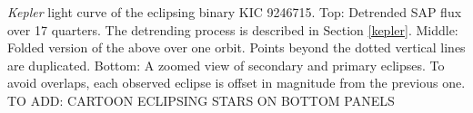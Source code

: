\label{fig:keplerfig} \emph{Kepler} light curve of the eclipsing binary KIC 9246715. Top: Detrended SAP flux over 17 quarters. The detrending process is described in Section \ref{kepler}. Middle: Folded version of the above over one orbit. Points beyond the dotted vertical lines are duplicated. Bottom: A zoomed view of secondary and primary eclipses. To avoid overlaps, each observed eclipse is offset in magnitude from the previous one. TO ADD: CARTOON ECLIPSING STARS ON BOTTOM PANELS